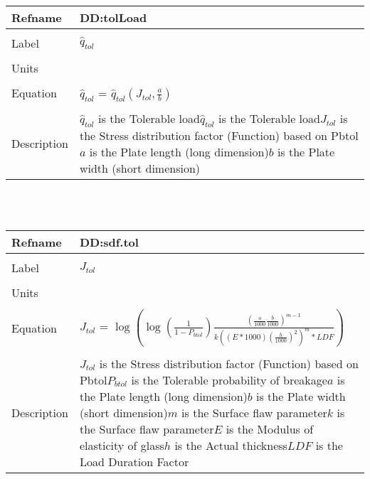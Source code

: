 \documentclass[12pt]{article}
\begin{document}
~\newline
\noindent \begin{minipage}{\textwidth}
\begin{tabular}{p{} p{}}
\toprule \textbf{Refname} & \textbf{DD:tolLoad}
\label{DD:tolLoad}
\\ \midrule \\
Label & $\hat{q}_{tol}$
\\ \midrule \\
Units & 
\\ \midrule \\
Equation & $\hat{q}_{tol}$ = $\hat{q}_{tol}(J_{tol},\frac{a}{b})$
\\ \midrule \\
Description & $\hat{q}_{tol}$ is the Tolerable load\newline$\hat{q}_{tol}$ is the Tolerable load\newline$J_{tol}$ is the Stress distribution factor (Function) based on Pbtol\newline$a$ is the Plate length (long dimension)\newline$b$ is the Plate width (short dimension)
\\ \bottomrule \end{tabular}
\end{minipage}\\
~\newline
\noindent \begin{minipage}{\textwidth}
\begin{tabular}{p{} p{}}
\toprule \textbf{Refname} & \textbf{DD:sdf.tol}
\label{DD:sdf.tol}
\\ \midrule \\
Label & $J_{tol}$
\\ \midrule \\
Units & 
\\ \midrule \\
Equation & $J_{tol}$ = $\log(\log(\frac{1}{1-P_{btol}})\frac{(\frac{a}{1000}\frac{b}{1000})^{m-1}}{k((E*1000)(\frac{h}{1000})^{2})^{m}*LDF})$
\\ \midrule \\
Description & $J_{tol}$ is the Stress distribution factor (Function) based on Pbtol\newline$P_{btol}$ is the Tolerable probability of breakage\newline$a$ is the Plate length (long dimension)\newline$b$ is the Plate width (short dimension)\newline$m$ is the Surface flaw parameter\newline$k$ is the Surface flaw parameter\newline$E$ is the Modulus of elasticity of glass\newline$h$ is the Actual thickness\newline$LDF$ is the Load Duration Factor
\\ \bottomrule \end{tabular}
\end{minipage}\\
\end{document}
